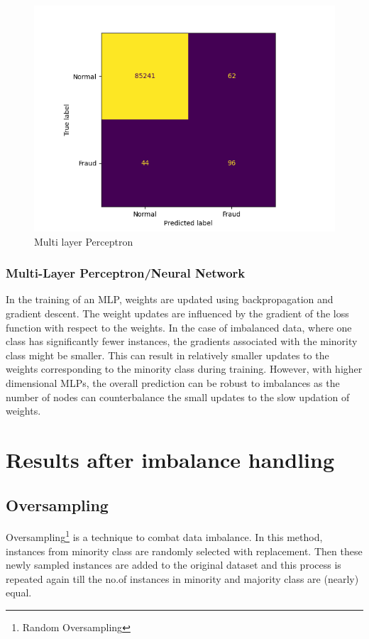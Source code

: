 \documentclass[letterpaper, 11 pt, conference]{ieeeconf}  %
\begin{document}
\begin{figure}[h]
	\centering
	\includegraphics[width=0.92\columnwidth]{Images/MLP_norm_CF.png}
	\caption{Multi layer Perceptron}
	\label{fig:dt_CF}
\end{figure}

\subsubsection{Multi-Layer Perceptron/Neural Network}
In the training of an MLP, weights are updated using backpropagation and gradient descent. The weight updates are influenced by the gradient of the loss function with respect to the weights. In the case of imbalanced data, where one class has significantly fewer instances, the gradients associated with the minority class might be smaller. This can result in relatively smaller updates to the weights corresponding to the minority class during training. However, with higher dimensional MLPs, the overall prediction can be robust to imbalances as the number of nodes can counterbalance the small updates to the slow updation of weights.

\section{Results after imbalance handling}
\label{sec:imbh}
\subsection{Oversampling}
Oversampling\footnote{Random Oversampling} is a technique to combat data imbalance. In this method, instances from minority class are randomly selected with replacement. Then these newly sampled instances are added to the original dataset and this process is repeated again till the no.of instances in minority and majority class are (nearly) equal.
\end{document}
